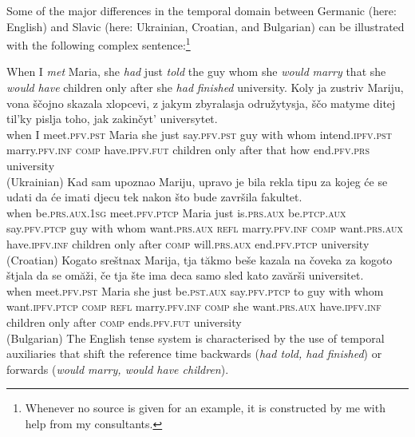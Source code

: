 \documentclass[output=paper,colorlinks,citecolor=brown]{langscibook}
\begin{document}
Some of the major differences  in the temporal domain between Germanic (here: English) and Slavic (here: Ukrainian, Croatian, and Bulgarian) can be illustrated with the following complex sentence:\footnote{Whenever no source is given for an example, it is constructed by me with help from my consultants.}


\ea\label{gr:ex:complex}
\ea\label{gr:ex:eng1} When I \textit{met} Maria, she
 \textit{had} just \textit{told} the guy whom she \textit{would} \textit{marry} that she \textit{would} \textit{have} children only after she \textit{had} \textit{finished} university. 
\ex\label{ag:ex:ukr1}\gll 
Koly ja zustriv Mariju, vona
ščojno skazala xlopcevi, z jakym zbyralasja odružytysja, ščo  matyme ditej til'ky pislja toho, jak zakinčyt' universytet.\\
when I meet.\textsc{pfv.pst} Maria she just say.\textsc{pfv.pst} guy with whom intend.\textsc{ipfv.pst} marry.\textsc{pfv.inf} \textsc{comp} have.\textsc{ipfv.fut} children only after that how end.\textsc{pfv.prs} university \\\hfill (Ukrainian) 
  \ex\label{ag:ex:cr1}\gll Kad sam upoznao Mariju, upravo je  bila rekla tipu za kojeg će se udati da će imati djecu tek nakon što bude završila fakultet.\\ 
  when be.\textsc{prs.aux.1sg} meet.\textsc{pfv.ptcp} Maria  just is.\textsc{prs.aux}   be.\textsc{ptcp.aux}  say.\textsc{pfv.ptcp} guy with whom want.\textsc{prs.aux} \textsc{refl} marry.\textsc{pfv.inf} \textsc{comp} want.\textsc{prs.aux} have.\textsc{ipfv.inf} children only after \textsc{comp} will.\textsc{prs.aux} end.\textsc{pfv.ptcp} university \\   \hfill   (Croatian) 
 \ex\label{ag:ex:bu1}\gll Kogato sreštnax Marija, tja tăkmo beše kazala na čoveka za kogoto štjala da se omăži, če tja šte ima deca samo sled kato zavărši universitet.
 \\ 
  when meet.\textsc{pfv.pst} Maria she just be.\textsc{pst.aux}   say.\textsc{pfv.ptcp} to guy with whom want.\textsc{ipfv.ptcp} \textsc{comp}          \textsc{refl}  marry.\textsc{pfv.inf} \textsc{comp} she want.\textsc{prs.aux} have.\textsc{ipfv.inf} children only after \textsc{comp} ends.\textsc{pfv.fut} university
 \\   \hfill   (Bulgarian) 
 \z\z
The English tense system is characterised by the use of temporal auxiliaries that shift the reference time backwards (\textit{had told, had finished}) or forwards (\textit{would marry, would have children}). 
\end{document}
